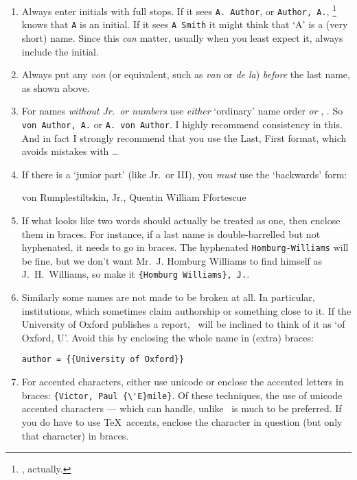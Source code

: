 {\begin{enumerate}
\item Always enter initials with full stops. If it sees \verb|A. Author|, or \verb|Author, A.|, \biblatex\footnote{, actually.} knows that \verb|A| is an initial. If it sees \verb|A Smith| it might think that `A' is a (very short) name. Since this \emph{can} matter, usually when you least expect it, always include the initial.
\item Always put any \emph{von} (or equivalent, such as \emph{van} or \emph{de la}) \emph{before} the last name, as shown above.
\item For names \emph{without Jr.\ or numbers} use \emph{either} `ordinary' name order \emph{or} , . So \verb|von Author, A.| or \verb|A. von Author|. I highly recommend consistency in this. And in fact I strongly recommend that you use the Last, First format, which avoids mistakes with \ldots
\item If there is a `junior part' (like Jr.\ or III), you \emph{must} use the `backwards' form:\begin{center}von Rumplestiltskin, Jr., Quentin William Ffortescue\end{center}
\item If what looks like two words should actually be treated as one, then enclose them in braces. For instance, if a last name is double-barrelled but not hyphenated, it needs to go in braces. The hyphenated \verb|Homburg-Williams| will be fine, but we don't want Mr.\ J. Homburg Williams to find himself as J.\ H.~Williams, so make it \verb|{Homburg Williams}, J.|.
\item Similarly some names are not made to be broken at all. In particular, institutions, which sometimes claim authorship or something close to it. If the University of Oxford publishes a report, \biblatex\ will be inclined to think of it as `of Oxford, U'. Avoid this by enclosing the whole name in (extra) braces:
\begin{center}
\verb|author = {{University of Oxford}}|
\end{center}
\item For accented characters, either use unicode or enclose the accented letters in braces: \verb|{Victor, Paul {\'E}mile}|. Of these techniques, the use of unicode accented characters --- which  can handle, unlike \bibtex\ is much to be preferred. If you do have to use \TeX\ accents, enclose the character in question (but only that character) in braces.
\end{enumerate} 

}

